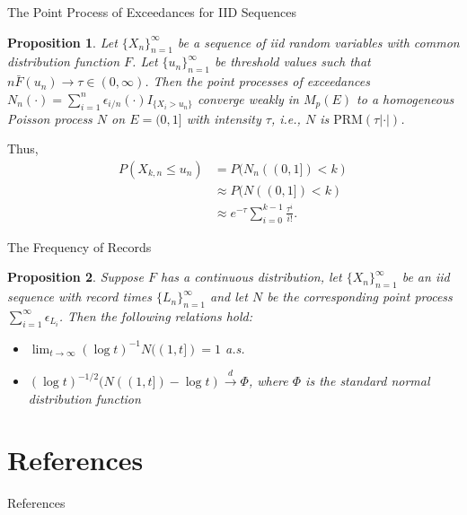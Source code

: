 \documentclass{beamer}
\newcommand{\PRM}{\text{PRM}}
\newtheorem{proposition}{Proposition}
\begin{document}
\begin{frame}{The Point Process of Exceedances for IID Sequences}
    \begin{proposition}
        Let $\{X_n\}_{n = 1}^{\infty}$ be a sequence of iid random variables with common distribution function $F$. Let $\{u_n\}_{n = 1}^{\infty}$ be threshold values such that $n\bar{F}(u_n) \to \tau \in (0, \infty)$. Then the point processes of exceedances $N_n(\cdot) = \sum_{i = 1}^n \epsilon_{i / n}(\cdot)I_{\{X_i > u_n\}}$ converge weakly in $M_p(E)$ to a homogeneous Poisson process $N$ on $E = (0, 1]$ with intensity $\tau$, i.e., $N$ is $\PRM(\tau|\cdot|)$.
    \end{proposition}

    Thus,
    \begin{align*}
        P(X_{k, n} \le u_n) &= P(N_n((0, 1]) < k) \\
        &\approx P(N((0, 1]) < k) \\
        &\approx e^{-\tau}\sum_{i = 0}^{k - 1} \frac{\tau^i}{i!}.
    \end{align*}
\end{frame}

\begin{frame}{The Frequency of Records}
    \begin{proposition}
        Suppose $F$ has a continuous distribution, let $\{X_n\}_{n = 1}^{\infty}$ be an iid sequence with record times $\{L_n\}_{n = 1}^{\infty}$ and let $N$ be the corresponding point process $\sum_{i = 1}^{\infty} \epsilon_{L_i}$. Then the following relations hold:
        \begin{itemize}
            \item $\lim_{t \to \infty} (\log t)^{-1}N((1, t]) = 1$ a.s.
            \item $(\log t)^{-1 / 2}(N((1, t]) - \log t) \xrightarrow{d} \Phi$, where $\Phi$ is the standard normal distribution function
        \end{itemize}
    \end{proposition}
\end{frame}

\section{References}

\begin{frame}[allowframebreaks]{References}
    \nocite{*}
    \printbibliography
\end{frame}
\end{document}
